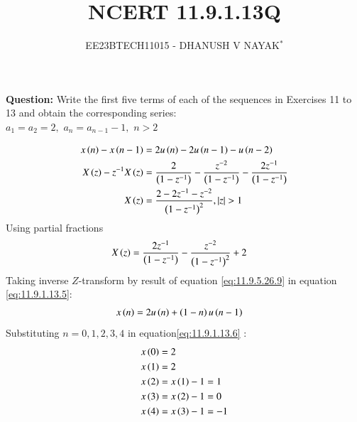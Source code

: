 \documentclass[journal,12pt,twocolumn]{IEEEtran}
\theoremstyle{remark}
\begin{document}

\title{NCERT 11.9.1.13Q}
\author{EE23BTECH11015 - DHANUSH V NAYAK$^{*}$%
}
\maketitle
\newpage
\bigskip
\renewcommand{\thefigure}{\arabic{figure}}
\renewcommand{\thetable}{\theenumi}
\textbf{Question:} Write the first five terms of each of the sequences in Exercises 11 to 13 and obtain the corresponding series:\\
$a_1=a_2=2,$\hspace{5pt} $a_n=a_{n-1} -1,$\hspace{5pt} $n>2$\\
\solution

\begin{align}
    x\left(n\right) - x\left(n-1\right) &= 2u\left(n\right)-2u\left(n-1\right)-u\left(n-2\right)\label{eq:11.9.1.13.1}\\
X\left(z\right)- z^{-1}X\left(z\right) &= \frac{2}{\left(1-z^{-1}\right)} - \frac{z^{-2}}{\left(1-z^{-1}\right)}- \frac{2z^{-1}}{\left(1-z^{-1}\right)}\\
    X\left(z\right) &= \frac{2-2z^{-1}-z^{-2}}{\left(1-z^{-1}\right)^2}  ,   \left\vert z\right\vert >1
\end{align}
Using partial fractions
\begin{align}
    X\left(z\right) &= \frac{2z^{-1}}{\left(1-z^{-1}\right)} - \frac{z^{-2}}{\left(1-z^{-1}\right)^2} + 2\label{eq:11.9.1.13.5}
\end{align}
Taking inverse $Z$-transform by result of equation \eqref{eq:11.9.5.26.9} in equation \eqref{eq:11.9.1.13.5}:
\begin{align}
    x\left(n\right) &= 2u\left(n\right)+\left(1-n\right)u\left(n-1\right)\label{eq:11.9.1.13.6}
\end{align}
Substituting $n=0,1,2,3,4$ in equation\eqref{eq:11.9.1.13.6} :
\begin{align}
    x\left(0\right) &= 2\\
    x\left(1\right) &= 2\\
    x\left(2\right) &= x\left(1\right) - 1 = 1  \\
    x\left(3\right) &= x\left(2\right) - 1 = 0\\
    x\left(4\right) &= x\left(3\right) - 1 = -1 
\end{align}
\end{document}
